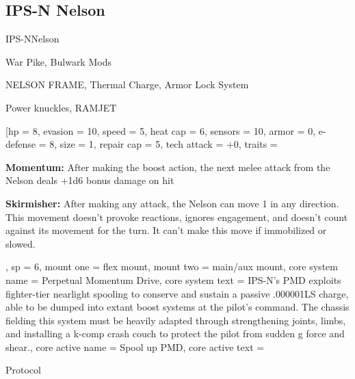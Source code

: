 \subsection{IPS-N Nelson}

\begin{mech}{IPS-N}{Nelson}


\begin{license}
\item War Pike, Bulwark Mods
\item NELSON FRAME, Thermal Charge, Armor Lock System
\item Power knuckles, RAMJET
\end{license}

\frameBox
[hp = 8,
evasion = 10,
speed = 5,
heat cap = 6,
sensors = 10,
armor = 0,
e-defense = 8,
size = 1,
repair cap = 5,
tech attack = +0,
traits = {\textbf{Momentum:} After making the boost action, the next melee attack from the Nelson deals +1d6 bonus damage on hit

\textbf{Skirmisher:} After making any attack, the Nelson can move 1 in any direction. This movement doesn’t provoke reactions, ignores engagement, and doesn’t count against its movement for the turn. It can’t make this move if immobilized or slowed.},
sp = 6,
mount one = flex mount,
mount two = main/aux mount,
core system name = Perpetual Momentum Drive,
core system text = {IPS-N’s PMD exploits fighter-tier nearlight spooling to conserve and sustain a passive .000001LS charge, able to be dumped into extant boost systems at the pilot’s command. The chassis fielding this system must be heavily adapted through strengthening joints, limbs, and installing a k-comp crash couch to protect the pilot from sudden g force and shear.},
core active name = Spool up PMD,
core active text = {Protocol

}
\end{mech}
